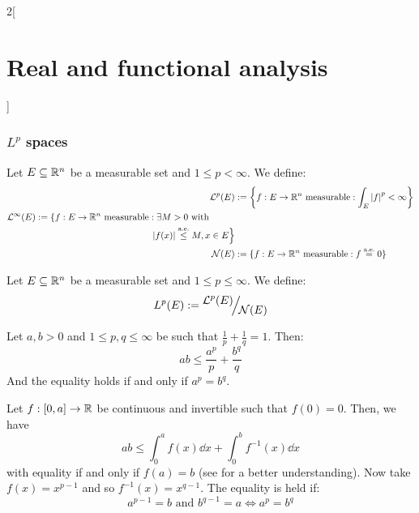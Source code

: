 \documentclass[../../../main_math.tex]{subfiles}
\begin{document}
\begin{multicols}{2}[\section{Real and functional analysis}]
  \subsubsection{\texorpdfstring{$L^p$}{Lp} spaces}
  \begin{definition}
    Let $E\subseteq\mathbb{R}^n$ be a measurable set and $1\leq p<\infty$. We define:
    \begin{align*}
      \mathcal{L}^p(E) & :=\left\{{f}:E\rightarrow \RR^n\text{ measurable}:\int_E\abs{{f}}^p<\infty\right\}                                                                                                          \\
      \begin{split}
        \mathcal{L}^\infty(E) &:=\left\{{f}:E\rightarrow \RR^n\text{ measurable}:\exists M>0\text{ with }\right.\\&\hspace{4.4cm}\left.\abs{{f}(x)}\almoste{\leq} M, x\in E\right\}
      \end{split} \\
      \mathcal{N}(E)   & :=\{{f}:E\rightarrow \RR^n\text{ measurable}:{f}\almoste{=} 0\}
    \end{align*}
  \end{definition}
  \begin{definition}
    Let $E\subseteq\mathbb{R}^n$ be a measurable set and $1\leq p\leq\infty$. We define: $$L^p(E):=\quot{\mathcal{L}^p(E)}{\mathcal{N}(E)}$$
  \end{definition}
  \begin{lemma}\label{RFA:young}
    Let $a,b>0$ and $1\leq p,q\leq \infty$ be such that $\frac{1}{p}+\frac{1}{q}=1$. Then:
    $$ab\leq\frac{a^p}{p}+\frac{b^q}{q}$$
    And the equality holds if and only if $a^p=b^q$.
  \end{lemma}
  \begin{sproof}
    Let $f:[0,a]\rightarrow\mathbb{R}$ be continuous and invertible such that $f(0)=0$. Then, we have
    $$ab\leq \int_{0}^{a}f(x)\dd{x}+\int_{0}^{b}f^{-1}(x)\dd{x}$$
    with equality if and only if $f(a)=b$ (see  for a better understanding). Now take $f(x)= x^{p-1}$ and so $f^{-1}(x)=x^{q-1}$. The equality is held if: $$a^{p-1} = b\text{ and }b^{q-1}=a\iff a^p = b^q$$
    \begin{figure}[H]
      \centering
      
      \caption{}
      \label{RFA:youngfigure}
    \end{figure}
  \end{sproof}

\end{multicols}
\end{document}
